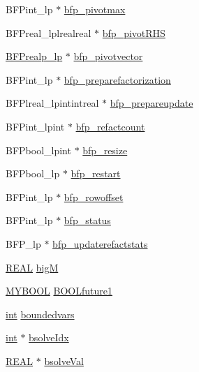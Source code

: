 \begin{DoxyCompactItemize}
B\+F\+Pint\+\_\+lp $\ast$ \hyperlink{struct__lprec_ab6a3ff8cd1298858ead6a8b57bc5a282}{bfp\+\_\+pivotmax}
\item 
B\+F\+Preal\+\_\+lplrealreal $\ast$ \hyperlink{struct__lprec_ac9172bf69b9932cef34c4afb11f0030c}{bfp\+\_\+pivot\+R\+HS}
\item 
\hyperlink{lp__lib_8h_a0dd40c2660be87c7ce483d7fa2657deb}{B\+F\+Prealp\+\_\+lp} $\ast$ \hyperlink{struct__lprec_a34ee5d6a367e3df5f10e7b0ed8569258}{bfp\+\_\+pivotvector}
\item 
B\+F\+Pint\+\_\+lp $\ast$ \hyperlink{struct__lprec_af80d88eedaa3169dd188b251228864a4}{bfp\+\_\+preparefactorization}
\item 
B\+F\+Plreal\+\_\+lpintintreal $\ast$ \hyperlink{struct__lprec_aad043ff05e226b9645a35120b620ebd0}{bfp\+\_\+prepareupdate}
\item 
B\+F\+Pint\+\_\+lpint $\ast$ \hyperlink{struct__lprec_a9581e7f29936cedf495f715ae8f5f17b}{bfp\+\_\+refactcount}
\item 
B\+F\+Pbool\+\_\+lpint $\ast$ \hyperlink{struct__lprec_a3cd676a2679d9c0a3cad707040870b2c}{bfp\+\_\+resize}
\item 
B\+F\+Pbool\+\_\+lp $\ast$ \hyperlink{struct__lprec_aa9a79ad1fed991fbaa09bab1a396f7de}{bfp\+\_\+restart}
\item 
B\+F\+Pint\+\_\+lp $\ast$ \hyperlink{struct__lprec_a4571931997ecca9c41f587389fff76f6}{bfp\+\_\+rowoffset}
\item 
B\+F\+Pint\+\_\+lp $\ast$ \hyperlink{struct__lprec_a2efec89c6004fe2385d62c6fc95b49f5}{bfp\+\_\+status}
\item 
B\+F\+P\+\_\+lp $\ast$ \hyperlink{struct__lprec_ada78de8dbd87578bd83fd62ec35b5091}{bfp\+\_\+updaterefactstats}
\item 
\hyperlink{lp__lib_8h_a92bd5e363d131fa73669358edb232dce}{R\+E\+AL} \hyperlink{struct__lprec_a9b685184c88dca1c1c38f95fb703eb44}{bigM}
\item 
\hyperlink{lp__lib_8h_aad848328fb3018217ac9f01d97b6bd88}{M\+Y\+B\+O\+OL} \hyperlink{struct__lprec_a1aec0f1f92b20101762a33f2234e820a}{B\+O\+O\+Lfuture1}
\item 
\hyperlink{lp__lib_8h_adeb9ec6400320e4923ac9d836d509ddb}{int} \hyperlink{struct__lprec_a6f12a80e4c086c6b84e92200b287da6b}{boundedvars}
\item 
\hyperlink{lp__lib_8h_adeb9ec6400320e4923ac9d836d509ddb}{int} $\ast$ \hyperlink{struct__lprec_ad618e0096bc7baaf24be4aed8cc63e75}{bsolve\+Idx}
\item 
\hyperlink{lp__lib_8h_a92bd5e363d131fa73669358edb232dce}{R\+E\+AL} $\ast$ \hyperlink{struct__lprec_a7a83e7832f44f037cb09c36c2046ead6}{bsolve\+Val}

\end{DoxyCompactItemize}
